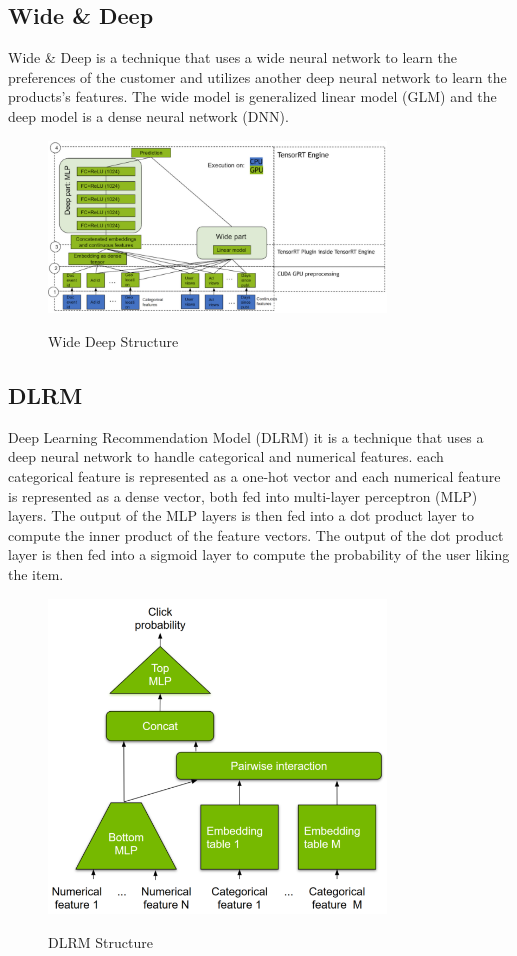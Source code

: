 \subsection{Wide \& Deep}
Wide \& Deep is a technique that uses a wide neural network to learn the preferences of the customer and utilizes another deep neural network to learn the products's features. The wide model is generalized linear model (GLM) and the deep model is a dense neural network (DNN).
\begin{figure}[H]
    \centering
    \includegraphics[width=0.8\textwidth]{assets/wide_deep.png}
    \caption{Wide Deep Structure}
    \label{fig:wide-deep}
    \cite{NvidiaRecSys}
\end{figure}

\subsection{DLRM}
Deep Learning Recommendation Model (DLRM) it is a technique that uses a deep neural network to handle categorical and numerical features. each categorical feature is represented as a one-hot vector and each numerical feature is represented as a dense vector, both fed into multi-layer perceptron (MLP) layers. The output of the MLP layers is then fed into a dot product layer to compute the inner product of the feature vectors. The output of the dot product layer is then fed into a sigmoid layer to compute the probability of the user liking the item.
\begin{figure}[H]
    \centering
    \includegraphics[width=0.8\textwidth]{assets/dlrm.png}
    \caption{DLRM Structure}
    \label{fig:dlrm}
    \cite{NvidiaRecSys}
\end{figure}
